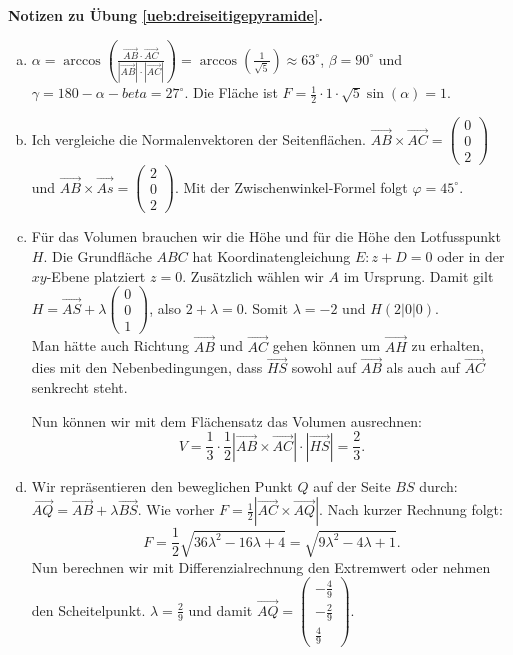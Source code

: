 \documentclass[%
11pt,%
twoside,%
titlepage,%
german,%
headsepline%
]{scrartcl}
\theoremstyle{definition}
\theoremstyle{plain}
\newcommand{\concatueb}[1]{ueb:#1}%
\newcommand{\concatlsg}[1]{lsg:#1}%
\newenvironment{lsg}[1]{%
    \par\noindent\textbf{Notizen zu Übung \ref{\concatueb{#1}}.}%
    \label{\concatlsg{#1}}
}{%
    \par%
}
\begin{document}
\begin{lsg}{dreiseitigepyramide}
    \begin{enumerate}[a)]
        \item $\alpha=\arccos\left(\frac{\vec{AB}\cdot\vec{AC}}{|\vec{AB}|\cdot|\vec{AC}|}\right)=\arccos(\frac{1}{\sqrt{5}})\approx63^\circ$, $\beta=90^\circ$ und $\gamma=180-\alpha-beta=27^\circ$. Die Fläche ist $F=\frac{1}{2}\cdot1\cdot\sqrt{5}\sin(\alpha)=1$.

        \item Ich vergleiche die Normalenvektoren der Seitenflächen. $\vec{AB}\times\vec{AC}=\begin{pmatrix}
            0\\0\\2
        \end{pmatrix}$ und $\vec{AB}\times\vec{As}=\begin{pmatrix}
            2\\0\\2
        \end{pmatrix}$. Mit der Zwischenwinkel-Formel folgt $\varphi=45^\circ$.

        \item Für das Volumen brauchen wir die Höhe und für die Höhe den Lotfusspunkt $H$. Die Grundfläche $ABC$ hat Koordinatengleichung $E:z+D=0$ oder in der $xy$-Ebene platziert $z=0$. Zusätzlich wählen wir $A$ im Ursprung. Damit gilt $H=\vec{AS}+\lambda\begin{pmatrix}
            0\\0\\1
        \end{pmatrix}$, also $2+\lambda=0$. Somit $\lambda=-2$ und $H(2|0|0)$.\\
        Man hätte auch Richtung $\vec{AB}$ und $\vec{AC}$ gehen können um $\vec{AH}$ zu erhalten, dies mit den Nebenbedingungen, dass $\vec{HS}$ sowohl auf $\vec{AB}$ als auch auf $\vec{AC}$ senkrecht steht.

        Nun können wir mit dem Flächensatz das Volumen ausrechnen:
        $$V=\frac{1}{3}\cdot\frac{1}{2}|\vec{AB}\times\vec{AC}|\cdot|\vec{HS}|=\frac{2}{3}.$$

        \item Wir repräsentieren den beweglichen Punkt $Q$ auf der Seite $BS$ durch: $\vec{AQ}=\vec{AB}+\lambda\vec{BS}$. Wie vorher $F=\frac{1}{2}|\vec{AC}\times\vec{AQ}|$. Nach kurzer Rechnung folgt:
        $$F=\frac{1}{2}\sqrt{36\lambda^2-16\lambda+4}=\sqrt{9\lambda^2-4\lambda+1}.$$
        Nun berechnen wir mit Differenzialrechnung den Extremwert oder nehmen den Scheitelpunkt. $\lambda=\frac{2}{9}$ und damit $\vec{AQ}=\begin{pmatrix}
            -\frac{4}{9}\\-\frac{2}{9}\\ \frac{4}{9}
        \end{pmatrix}$.
    \end{enumerate}
\end{lsg}
\end{document}
